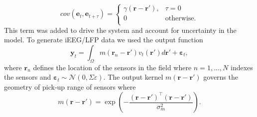 \documentclass[12pt]{iopart}		%
\begin{document}
\begin{equation}
    cov(\mathbf{e}_t,\mathbf{e}_{t+\tau}) = \left\{ \begin{array}{*{20}{c}}
    \gamma\left(\mathbf{r}-\mathbf{r'}\right), & \tau=0 \\
    0 & \mathrm{otherwise}. \\
    \end{array} \right.
\end{equation}
This term was added to drive the system and account for uncertainty in the model. To generate iEEG/LFP data we used the output function 
\begin{equation}
	\mathbf{y}_t = \int_{\Omega}{m\left(\mathbf{r}_n-\mathbf{r}'\right)v_t\left(\mathbf{r}'\right)d\mathbf{r}'} + \boldsymbol{\varepsilon}_t,
\end{equation}
where $\mathbf{r}_n$ defines the location of the sensors in the field where $n=1,...,N$ indexes the sensors and $\boldsymbol{\varepsilon}_t \sim \mathcal{N}\left(0,\Sigma{\varepsilon}\right)$. The output kernel $m(\mathbf{r}-\mathbf{r}')$ governs the geometry of pick-up range of sensors where
\begin{equation}
	m\left(\mathbf{r}-\mathbf{r}'\right) = \exp{\left(-\frac{(\mathbf{r}-\mathbf{r}')^\top(\mathbf{r}-\mathbf{r}')}{\sigma_m^2}\right)}.
\end{equation}
\end{document}
